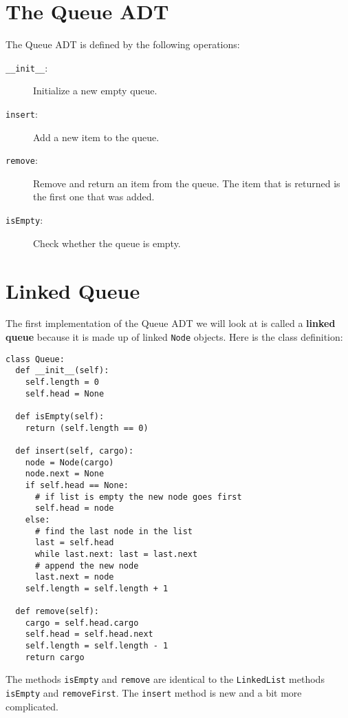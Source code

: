 
\section{The Queue ADT}

The Queue ADT is defined by the following operations:

\begin{description}

\item[{\tt \_\_init\_\_}:] Initialize a new empty queue.

\item[{\tt insert}:] Add a new item to the queue.

\item[{\tt remove}:] Remove and return an item from the queue.  The item
that is returned is the first one that was added.

\item[{\tt isEmpty}:] Check whether the queue is empty.

\end{description}


\section{Linked Queue}

The first implementation of the Queue ADT we will look at is
called a {\bf linked queue} because it is made up of linked
{\tt Node} objects.  Here is the class definition:

\beforeverb
\begin{verbatim}
class Queue:
  def __init__(self):
    self.length = 0
    self.head = None

  def isEmpty(self):
    return (self.length == 0)

  def insert(self, cargo):
    node = Node(cargo)
    node.next = None
    if self.head == None:
      # if list is empty the new node goes first
      self.head = node
    else:
      # find the last node in the list
      last = self.head
      while last.next: last = last.next
      # append the new node
      last.next = node
    self.length = self.length + 1

  def remove(self):
    cargo = self.head.cargo
    self.head = self.head.next
    self.length = self.length - 1
    return cargo
\end{verbatim}
\afterverb
%
The methods {\tt isEmpty} and {\tt remove} are identical to the
{\tt LinkedList} methods {\tt isEmpty} and {\tt removeFirst}.
The {\tt insert} method is new and a bit more complicated.

